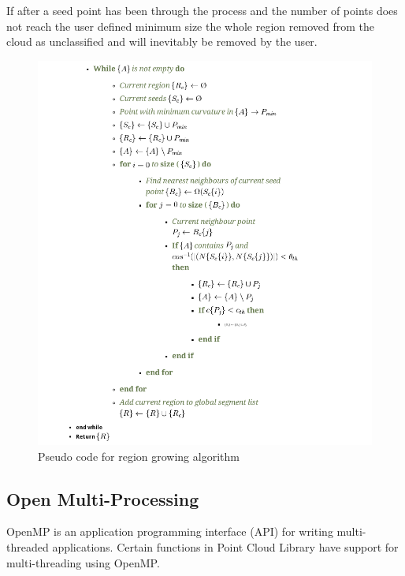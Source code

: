 		If after a seed point has been through the process and the number of points does not reach the user defined minimum size the whole region removed from the cloud as unclassified and will inevitably be removed by the user.
		
		
		\begin{figure}[H]
			\centering
			\includegraphics[width=0.7\linewidth]{Includes/images/LitReview/RegionGrowing}
			\caption{Pseudo code for region growing algorithm}
			\label{fig:RegionGrowing}
		\end{figure}

		

\subsection{Open Multi-Processing}
	OpenMP is an application programming interface (API) for writing multi-threaded applications. Certain functions in Point Cloud Library have support for multi-threading using OpenMP.
		

		
		
		
		
		
		
		
		
		
		